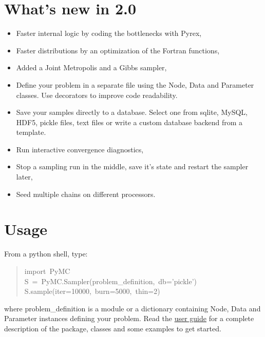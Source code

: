 \section*{What's new in 2.0}
\begin{itemize}
\item {} 
Faster internal logic by coding the bottlenecks with Pyrex,

\item {} 
Faster distributions by an optimization of the Fortran functions,

\item {} 
Added a Joint Metropolis and a Gibbs sampler,

\item {} 
Define your problem in a separate file using the Node, Data and Parameter
classes. Use decorators to improve code readability.

\item {} 
Save your samples directly to a database. Select one from sqlite, MySQL, HDF5,
pickle files, text files or write a custom database backend from a template.

\item {} 
Run interactive convergence diagnostics,

\item {} 
Stop a sampling run in the middle, save it's state and restart the sampler
later,

\item {} 
Seed multiple chains on different processors.

\end{itemize}



\hypertarget{usage}{}
\section*{Usage}

From a python shell, type:
\begin{quote}{\ttfamily \raggedright \noindent
import~PyMC~\\
S~=~PyMC.Sampler(problem{\_}definition,~db='pickle')~\\
S.sample(iter=10000,~burn=5000,~thin=2)
}\end{quote}

where problem{\_}definition is a module or a dictionary containing Node, Data and
Parameter instances defining your problem. Read the \href{docs/pdf/new_interface.pdf}{user guide} for a
complete description of the package, classes and some examples to get started.


